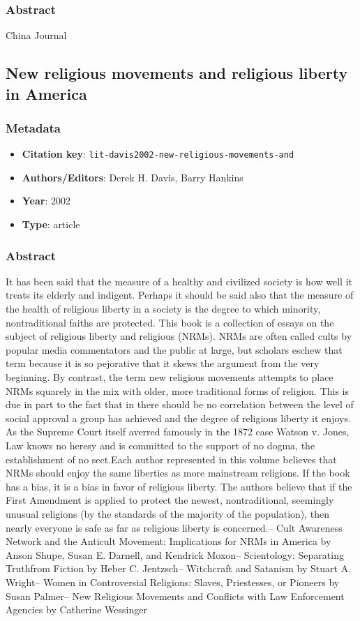 \subsubsection*{Abstract}
China Journal

\subsection{New religious movements and religious liberty in America}\label{lit:lit-davis2002-new-religious-movements-and}
\subsubsection*{Metadata}
\begin{itemize}
  \item \textbf{Citation key}: \texttt{lit-davis2002-new-religious-movements-and}
  \item \textbf{Authors/Editors}: Derek H. Davis, Barry Hankins
  \item \textbf{Year}: 2002
  \item \textbf{Type}: article
\end{itemize}
\subsubsection*{Abstract}
It has been said that the measure of a healthy and civilized society is how well it treats its elderly and indigent. Perhaps it should be said also that the measure of the health of religious liberty in a society is the degree to which minority, nontraditional faiths are protected. This book is a collection of essays on the subject of religious liberty and religious (NRMs). NRMs are often called cults by popular media commentators and the public at large, but scholars eschew that term because it is so pejorative that it skews the argument from the very beginning. By contrast, the term new religious movements attempts to place NRMs squarely in the mix with older, more traditional forms of religion. This is due in part to the fact that in there should be no correlation between the level of social approval a group has achieved and the degree of religious liberty it enjoys. As the Supreme Court itself averred famously in the 1872 case Watson v. Jones, Law knows no heresy and is committed to the support of no dogma, the establishment of no sect.Each author represented in this volume believes that NRMs should enjoy the same liberties as more mainstream religions. If the book has a bias, it is a bias in favor of religious liberty. The authors believe that if the First Amendment is applied to protect the newest, nontraditional, seemingly unusual religions (by the standards of the majority of the population), then nearly everyone is safe as far as religious liberty is concerned.-- Cult Awareness Network and the Anticult Movement: Implications for NRMs in America by Anson Shupe, Susan E. Darnell, and Kendrick Moxon-- Scientology: Separating Truthfrom Fiction by Heber C. Jentzsch-- Witchcraft and Satanism by Stuart A. Wright-- Women in Controversial Religions: Slaves, Priestesses, or Pioneers by Susan Palmer-- New Religious Movements and Conflicts with Law Enforcement Agencies by Catherine Wessinger

